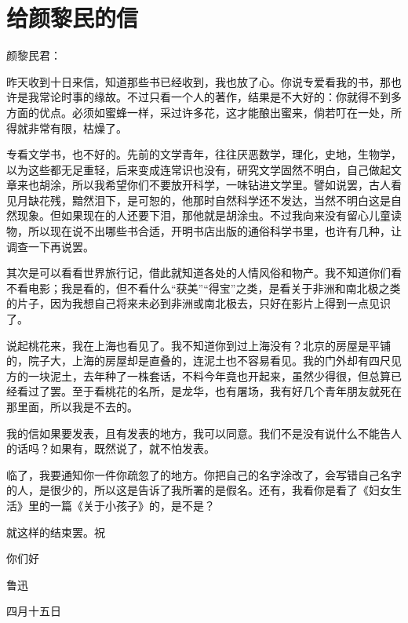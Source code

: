 \documentclass[12pt,UTF-8,openany]{ctexbook}
\begin{document}
\chapter{给颜黎民的信}

\begin{Large}
    
    \noindent 颜黎民君：
    
    \vspace{24pt}
    
    昨天收到十日来信，知道那些书已经收到，我也放了心。你说专爱看我的书，那也许是我常论时事的缘故。不过只看一个人的著作，结果是不大好的：你就得不到多方面的优点。必须如蜜蜂一样，采过许多花，这才能酿出蜜来，倘若叮在一处，所得就非常有限，枯燥了。
    
    专看文学书，也不好的。先前的文学青年，往往厌恶数学，理化，史地，生物学，以为这些都无足重轻，后来变成连常识也没有，研究文学固然不明白，自己做起文章来也胡涂，所以我希望你们不要放开科学，一味钻进文学里。譬如说罢，古人看见月缺花残，黯然泪下，是可恕的，他那时自然科学还不发达，当然不明白这是自然现象。但如果现在的人还要下泪，那他就是胡涂虫。不过我向来没有留心儿童读物，所以现在说不出哪些书合适，开明书店出版的通俗科学书里，也许有几种，让调查一下再说罢。
    
    其次是可以看看世界旅行记，借此就知道各处的人情风俗和物产。我不知道你们看不看电影；我是看的，但不看什么“获美”“得宝”之类，是看关于非洲和南北极之类的片子，因为我想自己将来未必到非洲或南北极去，只好在影片上得到一点见识了。
    
    说起桃花来，我在上海也看见了。我不知道你到过上海没有？北京的房屋是平铺的，院子大，上海的房屋却是直叠的，连泥土也不容易看见。我的门外却有四尺见方的一块泥土，去年种了一株套话，不料今年竟也开起来，虽然少得很，但总算已经看过了罢。至于看桃花的名所，是龙华，也有屠场，我有好几个青年朋友就死在那里面，所以我是不去的。
    
    我的信如果要发表，且有发表的地方，我可以同意。我们不是没有说什么不能告人的话吗？如果有，既然说了，就不怕发表。
    
    临了，我要通知你一件你疏忽了的地方。你把自己的名字涂改了，会写错自己名字的人，是很少的，所以这是告诉了我所署的是假名。还有，我看你是看了《妇女生活》里的一篇《关于小孩子》的，是不是？
    
    就这样的结束罢。祝
    
    你们好
    
    \vspace{36pt}
    
    \begin{flushright}
        鲁迅
        
        四月十五日
        
    \end{flushright}
    
    
    
\end{Large}
\end{document}
